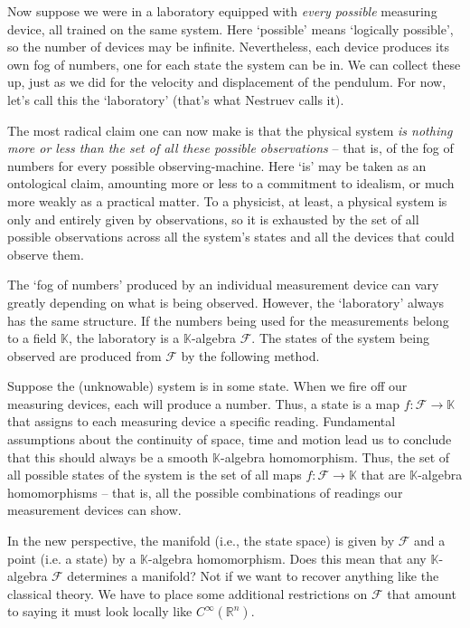 \documentclass[oneside,english]{amsbook}
\numberwithin{section}{chapter}
\theoremstyle{plain}
\theoremstyle{definition}
\begin{document}
Now suppose we were in a laboratory equipped with \emph{every possible} measuring device, all trained on the same system. Here `possible' means `logically possible', so the number of devices may be infinite. Nevertheless, each device produces its own fog of numbers, one for each state the system can be in. We can collect these up, just as we did for the velocity and displacement of the pendulum. For now, let's call this the `laboratory' (that's what Nestruev calls it).

The most radical claim one can now make is that the physical system \emph{is nothing more or less than the set of all these possible observations} -- that is, of the fog of numbers for every possible observing-machine. Here `is' may be taken as an ontological claim, amounting more or less to a commitment to idealism, or much more weakly as a practical matter. To a physicist, at least, a physical system is only and entirely given by observations, so it is exhausted by the set of all possible observations across all the system's states and all the devices that could observe them.

The `fog of numbers' produced by an individual measurement device can vary greatly depending on what is being observed. However, the `laboratory' always has the same structure. If the numbers being used for the measurements belong to a field $\mathbb{K}$, the laboratory is a $\mathbb{K}$-algebra $\mathscr{F}$. The states of the system being observed are produced from $\mathscr{F}$ by the following method. 

Suppose the (unknowable) system is in some state. When we fire off our measuring devices, each will produce a number. Thus, a state is a map $f:\mathscr{F}\to \mathbb{K}$ that assigns to each measuring device a specific reading. Fundamental assumptions about the continuity of space, time and motion lead us to conclude that this should always be a smooth $\mathbb{K}$-algebra homomorphism. Thus, the set of all possible states of the system is the set of all maps $f:\mathscr{F}\to \mathbb{K}$ that are $\mathbb{K}$-algebra homomorphisms -- that is, all the possible combinations of readings our measurement devices can show. 

In the new perspective, the manifold (i.e., the state space) is given by $\mathscr{F}$ and a point (i.e. a state) by a $\mathbb{K}$-algebra homomorphism. Does this mean that any $\mathbb{K}$-algebra $\mathscr{F}$ determines a manifold? Not if we want to recover anything like the classical theory. We have to place some additional restrictions on $\mathscr{F}$ that amount to saying it must look locally like $C^\infty(\mathbb{R}^n)$.
\end{document}
